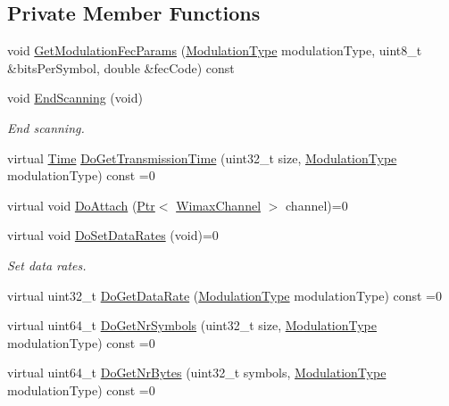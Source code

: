 \subsection*{Private Member Functions}
\begin{DoxyCompactItemize}
\item 
void \hyperlink{classns3_1_1WimaxPhy_a9b02c2174442658ff26e0b50aa12d355}{Get\+Modulation\+Fec\+Params} (\hyperlink{classns3_1_1WimaxPhy_a044c5d8a48ca992c39c2a946f6e755fa}{Modulation\+Type} modulation\+Type, uint8\+\_\+t \&bits\+Per\+Symbol, double \&fec\+Code) const 
\item 
void \hyperlink{classns3_1_1WimaxPhy_a122ba0cdb1762e22843afa81cbb8fd16}{End\+Scanning} (void)
\begin{DoxyCompactList}\small\item\em End scanning. \end{DoxyCompactList}\item 
virtual \hyperlink{classns3_1_1Time}{Time} \hyperlink{classns3_1_1WimaxPhy_a9f8a65aabc4d503a0d133d6a9d5f6f92}{Do\+Get\+Transmission\+Time} (uint32\+\_\+t size, \hyperlink{classns3_1_1WimaxPhy_a044c5d8a48ca992c39c2a946f6e755fa}{Modulation\+Type} modulation\+Type) const =0
\item 
virtual void \hyperlink{classns3_1_1WimaxPhy_a64d2c138575e256169ff1ee737e46310}{Do\+Attach} (\hyperlink{classns3_1_1Ptr}{Ptr}$<$ \hyperlink{classns3_1_1WimaxChannel}{Wimax\+Channel} $>$ channel)=0
\item 
virtual void \hyperlink{classns3_1_1WimaxPhy_a87393d9f21a60dc1929aa7a864ffa748}{Do\+Set\+Data\+Rates} (void)=0
\begin{DoxyCompactList}\small\item\em Set data rates. \end{DoxyCompactList}\item 
virtual uint32\+\_\+t \hyperlink{classns3_1_1WimaxPhy_ac3364fc82dab53b6161f2955cbfc0900}{Do\+Get\+Data\+Rate} (\hyperlink{classns3_1_1WimaxPhy_a044c5d8a48ca992c39c2a946f6e755fa}{Modulation\+Type} modulation\+Type) const =0
\item 
virtual uint64\+\_\+t \hyperlink{classns3_1_1WimaxPhy_a70261fad8bd55b6211b1f0f60200b889}{Do\+Get\+Nr\+Symbols} (uint32\+\_\+t size, \hyperlink{classns3_1_1WimaxPhy_a044c5d8a48ca992c39c2a946f6e755fa}{Modulation\+Type} modulation\+Type) const =0
\item 
virtual uint64\+\_\+t \hyperlink{classns3_1_1WimaxPhy_a761050747d76f9169b411324e6fa01f0}{Do\+Get\+Nr\+Bytes} (uint32\+\_\+t symbols, \hyperlink{classns3_1_1WimaxPhy_a044c5d8a48ca992c39c2a946f6e755fa}{Modulation\+Type} modulation\+Type) const =0

\end{DoxyCompactItemize}
